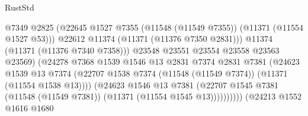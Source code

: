 \begin{lexlean}{RustStd}
\begin{coremodule}
                                              @7349
                                              @2825
                                              (@22645
                                                @1527
                                                @7355
                                                (@11548 (@11549 @7355))
                                                (@11371 (@11554 @1527 @53)))
                                              @22612
                                              @11374
                                              (@11371 (@11376 @7350 @2831)))
                                            @11374
                                            (@11371 (@11376 @7340 @7358)))
                                          @23548
                                          @23551
                                          @23554
                                          @23558
                                          @23563
                                          @23569)
                                        (@24278
                                          @7368
                                          @1539
                                          @1546
                                          @13
                                          @2831
                                          @7374
                                          @2831
                                          @7381
                                          (@24623
                                            @1539
                                            @13
                                            @7374
                                            (@22707
                                              @1538
                                              @7374
                                              (@11548 (@11549 @7374))
                                              (@11371 (@11554 @1538 @13))))
                                          (@24623
                                            @1546
                                            @13
                                            @7381
                                            (@22707
                                              @1545
                                              @7381
                                              (@11548 (@11549 @7381))
                                              (@11371 (@11554 @1545 @13))))))))))
                              (@24213
                                @1552
                                @1616
                                @1680

\end{coremodule}
\end{lexlean}
